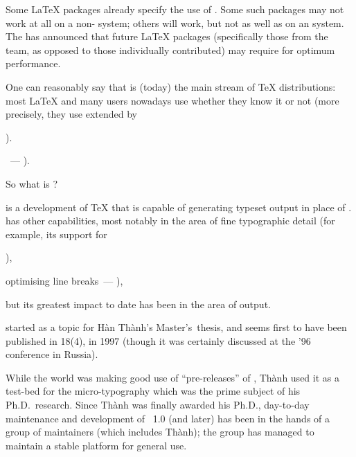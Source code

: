 Some \LaTeX{} packages already specify the use of \eTeX{}.  Some such
packages may not work at all on a non-\eTeX{} system; others will
work, but not as well as on an \eTeX{} system.  The %
 has announced that future \LaTeX{}
packages (specifically those from the team, as opposed to those
individually contributed) may require \eTeX{} for optimum performance.
\begin{ctanrefs}
\item[\eTeX{}]
\end{ctanrefs}


One can reasonably say that \PDFTeX{} is (today) the main stream of
\TeX{} distributions: most \LaTeX{} and many \CONTeXT{} users nowadays use
\PDFTeX{} whether they know it or not (more precisely, they use
\PDFTeX{} extended by
\begin{hyperversion}
  ).
\end{hyperversion}
\begin{flatversion}
  \eTeX{}~--- ).
\end{flatversion}
So what is \PDFTeX{}?

\PDFTeX{} is a development of \TeX{} that is capable of generating
typeset  output in place of .  \PDFTeX{} has
other capabilities, most notably in the area of fine typographic
detail (for example, its support for %
\begin{hyperversion}
  ),
\end{hyperversion}
\begin{flatversion}
  optimising line breaks~--- ),
\end{flatversion}
but its greatest impact to date has been in the area of
 output.

\PDFTeX{} started as a topic for H\`an \The {} Th\`anh's Master's~thesis,
and seems first to have been published in \TUGboat{} 18(4), in 1997
(though it was certainly discussed at the '96 conference in
Russia).

While the world was making good use of ``pre-releases'' of \PDFTeX{},
Th\`anh used it as a test-bed for the micro-typography which was the
prime subject of his Ph.D.~research.  Since Th\`anh was finally
awarded his Ph.D., day-to-day maintenance and development of
\PDFTeX{}~1.0 (and later) has been in the hands of a group of
\PDFTeX{} maintainers (which includes Th\`anh); the group has managed
to maintain a stable platform for general use.

